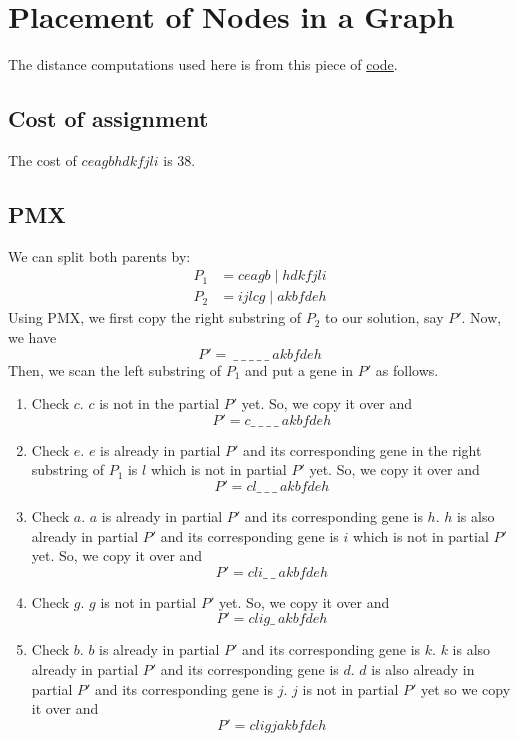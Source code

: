\section{Placement of Nodes in a Graph}

The distance computations used here is from this piece of \href{https://github.com/nngerncham/ma395_heuristic/blob/main/homework/hw4/code/src/main/scala/Problem4.scala}{code}.

\subsection{Cost of assignment}

The cost of \(ceagbhdkfjli\) is \(38\).

\subsection{PMX}

We can split both parents by:
\[
\begin{aligned}
    P_1 &= ceagb \mid hdkfjli \\
    P_2 &= ijlcg \mid akbfdeh
\end{aligned}
\]
Using PMX, we first copy the right substring of \(P_2\) to our solution, say \(P'\). Now, we have 
\[
    P' =\ \_\ \_\ \_\ \_\ \_\ akbfdeh
\]
Then, we scan the left substring of \(P_1\) and put a gene in \(P'\) as follows.
\begin{enumerate}
    \item Check \(c\). \(c\) is not in the partial \(P'\) yet. So, we copy it over and
        \[
            P' = c\_\ \_\ \_\ \_\ akbfdeh
        \]
    \item Check \(e\). \(e\) is already in partial \(P'\) and its corresponding gene in the right substring of \(P_1\) is \(l\) which is not in partial \(P'\) yet. So, we copy it over and
        \[
            P' = cl\_\ \_\ \_\ akbfdeh
        \]
    \item Check \(a\). \(a\) is already in partial \(P'\) and its corresponding gene is \(h\). \(h\) is also already in partial \(P'\) and its corresponding gene is \(i\) which is not in partial \(P'\) yet. So, we copy it over and
        \[
            P' = cli\_\ \_\ akbfdeh
        \]
    \item Check \(g\). \(g\) is not in partial \(P'\) yet. So, we copy it over and
        \[
            P' = clig\_\ akbfdeh
        \]
    \item Check \(b\). \(b\) is already in partial \(P'\) and its corresponding gene is \(k\). \(k\) is also already in partial \(P'\) and its corresponding gene is \(d\). \(d\) is also already in partial \(P'\) and its corresponding gene is \(j\). \(j\) is not in partial \(P'\) yet so we copy it over and
        \[
            P' = cligjakbfdeh
        \]
\end{enumerate}

